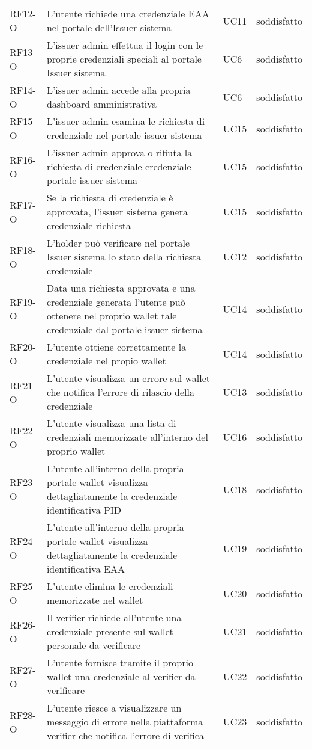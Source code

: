 \begin{longtable}{|p{}|p{}|p{}|p{}|}
        RF12-O & L'utente richiede una credenziale EAA nel portale dell'Issuer sistema & UC11& soddisfatto\\
        RF13-O & L'issuer admin effettua il login con le proprie credenziali speciali al portale Issuer sistema & UC6& soddisfatto\\ 
        RF14-O & L'issuer admin accede alla propria dashboard amministrativa & UC6& soddisfatto\\
        RF15-O & L'issuer admin esamina le richiesta di credenziale nel portale issuer sistema  & UC15& soddisfatto\\
        RF16-O & L'issuer admin approva o rifiuta la richiesta di credenziale credenziale portale issuer sistema & UC15& soddisfatto\\
        RF17-O & Se la richiesta di credenziale  è approvata, l'issuer sistema genera credenziale richiesta & UC15& soddisfatto\\
        RF18-O & L'holder può verificare nel portale Issuer sistema lo stato della richiesta credenziale & UC12& soddisfatto\\ 
        RF19-O & Data una richiesta approvata e una credenziale generata l'utente può ottenere nel proprio wallet tale credenziale dal portale issuer sistema & UC14 & soddisfatto\\
        RF20-O & L'utente ottiene correttamente la credenziale nel propio wallet & UC14& soddisfatto\\
        RF21-O & L'utente visualizza un errore sul wallet che notifica l'errore di rilascio della credenziale & UC13& soddisfatto\\
        RF22-O & L'utente visualizza una lista di credenziali memorizzate all'interno del proprio wallet& UC16& soddisfatto\\
        RF23-O & L'utente all'interno della propria portale wallet visualizza dettagliatamente la credenziale identificativa PID & UC18& soddisfatto\\
        RF24-O & L'utente all'interno della propria portale wallet visualizza dettagliatamente la credenziale identificativa EAA & UC19& soddisfatto\\
        RF25-O & L'utente elimina le credenziali memorizzate nel wallet & UC20& soddisfatto\\
        RF26-O & Il verifier richiede all'utente una credenziale presente sul wallet personale da verificare & UC21& soddisfatto\\
        RF27-O & L'utente fornisce tramite il proprio wallet una credenziale al verifier da verificare & UC22& soddisfatto\\
        RF28-O & L'utente riesce a visualizzare un messaggio di errore nella piattaforma verifier che notifica l'errore di verifica & UC23& soddisfatto\\
        \hline
    \end{longtable}


